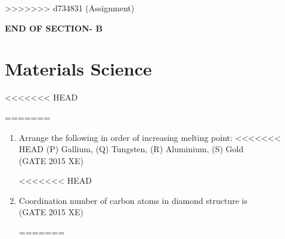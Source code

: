 \documentclass[journal,12pt,onecolumn]{IEEEtran}
\begin{document}
\begin{enumerate}
\begin{enumerate}
\end{enumerate}

\vspace{3\baselineskip}
>>>>>>> d734831 (Assignment)
\begin{center}
    \item[\textbf{END OF SECTION- B}]
\end{center}

\newpage

\section*{Materials Science}
<<<<<<< HEAD
\bigskip

\begin{enumerate}
=======
\vspace{1cm}

\begin{enumerate}[label=\arabic*)]
>>>>>>> d734831 (Assignment)


\item Arrange the following in order of increasing melting point:  
<<<<<<< HEAD
(P) Gallium, (Q) Tungsten, (R) Aluminium, (S) Gold  \\
\hfill{(GATE 2015 XE)} 
\begin{multicols}{4}
<<<<<<< HEAD
\end{multicols}

\item Coordination number of carbon atoms in diamond structure is  \\
\hfill{(GATE 2015 XE)} 
\begin{multicols}{4}
\begin{enumerate}
=======
\vspace{0.5cm}


\end{enumerate}
\end{multicols}
\end{enumerate}
\end{enumerate}
\end{enumerate}
\end{document}
